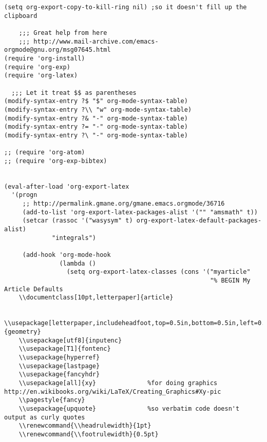 \documentclass[11pt]{article}
\begin{document}
\begin{verbatim}
(setq org-export-copy-to-kill-ring nil) ;so it doesn't fill up the clipboard

    ;;; Great help from here
    ;;; http://www.mail-archive.com/emacs-orgmode@gnu.org/msg07645.html
(require 'org-install)
(require 'org-exp)
(require 'org-latex)

  ;;; Let it treat $$ as parentheses
(modify-syntax-entry ?$ "$" org-mode-syntax-table)
(modify-syntax-entry ?\\ "w" org-mode-syntax-table)
(modify-syntax-entry ?& "-" org-mode-syntax-table)
(modify-syntax-entry ?= "-" org-mode-syntax-table)
(modify-syntax-entry ?\ "-" org-mode-syntax-table)

;; (require 'org-atom)
;; (require 'org-exp-bibtex)


(eval-after-load 'org-export-latex
  '(progn
     ;; http://permalink.gmane.org/gmane.emacs.orgmode/36716
     (add-to-list 'org-export-latex-packages-alist '("" "amsmath" t))
     (setcar (rassoc '("wasysym" t) org-export-latex-default-packages-alist)
             "integrals")

     (add-hook 'org-mode-hook
               (lambda ()
                 (setq org-export-latex-classes (cons '("myarticle"
                                                        "% BEGIN My Article Defaults
    \\documentclass[10pt,letterpaper]{article}
    
    \\usepackage[letterpaper,includeheadfoot,top=0.5in,bottom=0.5in,left=0.75in,right=0.75in]{geometry}
    \\usepackage[utf8]{inputenc}
    \\usepackage[T1]{fontenc}
    \\usepackage{hyperref}
    \\usepackage{lastpage}
    \\usepackage{fancyhdr}
    \\usepackage[all]{xy}              %for doing graphics http://en.wikibooks.org/wiki/LaTeX/Creating_Graphics#Xy-pic
    \\pagestyle{fancy}
    \\usepackage{upquote}              %so verbatim code doesn't output as curly quotes
    \\renewcommand{\\headrulewidth}{1pt}
    \\renewcommand{\\footrulewidth}{0.5pt}
    

\end{verbatim}
\end{document}
